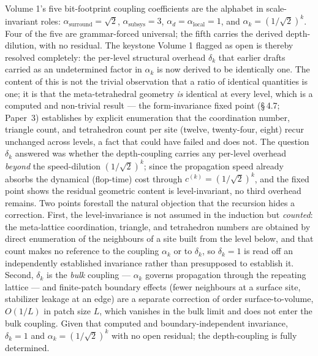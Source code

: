 \documentclass[11pt,oneside]{report}
\theoremstyle{definition}
\theoremstyle{remark}
\begin{document}
Volume 1's five bit-footprint coupling coefficients are the alphabet in
scale-invariant roles: \ensuremath{\alpha_{\mathrm{surround}} = \sqrt{2}},
\ensuremath{\alpha_{\mathrm{subsys}} = 3}, \ensuremath{\alpha_d =
\alpha_{\mathrm{local}} = 1}, and \ensuremath{\alpha_k = (1/\sqrt{2})^k}. Four of
the five are grammar-forced universal; the fifth carries the derived
depth-dilution, with no residual. The keystone Volume 1 flagged as open is
thereby resolved completely: the per-level structural overhead \ensuremath{\delta_k}
that earlier drafts carried as an undetermined factor in \ensuremath{\alpha_k} is now
derived to be identically one. The content of this is not the trivial observation
that a ratio of identical quantities is one; it is that the meta-tetrahedral
geometry \emph{is} identical at every level, which is a computed and non-trivial
result --- the form-invariance fixed point (\S\,4.7; Paper~3) establishes by
explicit enumeration that the coordination number, triangle count, and tetrahedron
count per site (twelve, twenty-four, eight) recur unchanged across levels, a fact
that could have failed and does not. The question \ensuremath{\delta_k} answered was whether
the depth-coupling carries any per-level overhead \emph{beyond} the speed-dilution
\ensuremath{(1/\sqrt{2})^k}; since the propagation speed already absorbs the dynamical
(flop-time) cost through \ensuremath{c^{(k)}=(1/\sqrt{2})^k}, and the fixed point shows the
residual geometric content is level-invariant, no third overhead remains. Two points
forestall the natural objection that the recursion hides a correction. First, the
level-invariance is not assumed in the induction but \emph{counted}: the
meta-lattice coordination, triangle, and tetrahedron numbers are obtained by direct
enumeration of the neighbours of a site built from the level below, and that count
makes no reference to the coupling \ensuremath{\alpha_k} or to \ensuremath{\delta_k}, so \ensuremath{\delta_k=1} is read
off an independently established invariance rather than presupposed to establish it.
Second, \ensuremath{\delta_k} is the \emph{bulk} coupling --- \ensuremath{\alpha_k} governs propagation through
the repeating lattice --- and finite-patch boundary effects (fewer neighbours at a
surface site, stabilizer leakage at an edge) are a separate correction of order
surface-to-volume, \ensuremath{O(1/L)} in patch size \ensuremath{L}, which vanishes in the bulk limit and
does not enter the bulk coupling. Given that computed and boundary-independent
invariance, \ensuremath{\delta_k = 1} and \ensuremath{\alpha_k = (1/\sqrt{2})^k} with no
open residual; the depth-coupling is fully determined.
\end{document}
